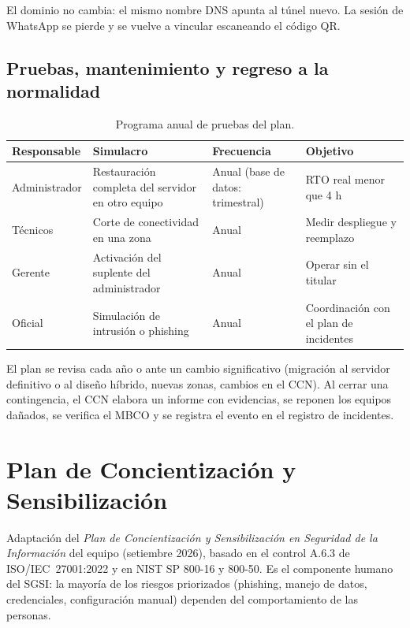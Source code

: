 \noindent El dominio no cambia: el mismo nombre DNS apunta al túnel nuevo. La sesión de
WhatsApp se pierde y se vuelve a vincular escaneando el código QR.

\section{Pruebas, mantenimiento y regreso a la normalidad}

\begin{table}[H]
\centering
\caption{Programa anual de pruebas del plan.}
\label{tab:anx-pcn-pruebas}
\small
\begin{tabularx}{\textwidth}{L{2.6cm}XL{1.6cm}X}
\toprule
\textbf{Responsable} & \textbf{Simulacro} & \textbf{Frecuencia} & \textbf{Objetivo} \\
\midrule
Administrador & Restauración completa del servidor en otro equipo & Anual (base de datos: trimestral) & RTO real menor que 4 h \\
Técnicos & Corte de conectividad en una zona & Anual & Medir despliegue y reemplazo \\
Gerente & Activación del suplente del administrador & Anual & Operar sin el titular \\
Oficial & Simulación de intrusión o phishing & Anual & Coordinación con el plan de incidentes \\
\bottomrule
\end{tabularx}
\end{table}

\noindent El plan se revisa cada año o ante un cambio significativo (migración al servidor
definitivo o al diseño híbrido, nuevas zonas, cambios en el CCN). Al cerrar una contingencia,
el CCN elabora un informe con evidencias, se reponen los equipos dañados, se verifica el
MBCO y se registra el evento en el registro de incidentes.

\chapter{Plan de Concientización y Sensibilización}
\label{anx:sgsi-concientizacion}

Adaptación del \emph{Plan de Concientización y Sensibilización en Seguridad de la
Información} del equipo (setiembre 2026), basado en el control A.6.3 de ISO/IEC~27001:2022 y
en NIST SP 800-16 y 800-50. Es el componente humano del SGSI: la mayoría de los riesgos
priorizados (phishing, manejo de datos, credenciales, configuración manual) dependen del
comportamiento de las personas.

